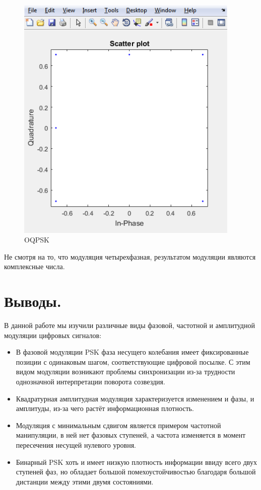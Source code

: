 \documentclass[a4paper,14pt]{extarticle}
\begin{document}
\begin{figure}[H]
\centering
\includegraphics[width=0.95\textwidth]{oqpsk}
\captionsetup{justification=centering,margin=1.0cm}
\caption{OQPSK}
\label{sig}
\end{figure}

Не смотря на то, что модуляция четырехфазная, результатом модуляции являются комплексные числа.

\vspace{8cm}

\section{Выводы.}

В данной работе мы изучили различные виды фазовой, частотной и амплитудной модуляции цифровых сигналов:
\begin{itemize}

\item В фазовой модуляции PSK фаза несущего колебания имеет фиксированные позиции с одинаковым шагом, соответствующие цифровой посылке. С этим видом модуляции возникают проблемы синхронизации из-за трудности однозначной интерпретации поворота созвездия.

\item Квадратурная амплитудная модуляция характеризуется изменением и фазы, и амплитуды, из-за чего растёт информационная плотность.

\item Модуляция с минимальным сдвигом является примером частотной манипуляции, в ней нет фазовых ступеней, а частота изменяется в момент пересечения несущей нулевого уровня.

\item Бинарный PSK хоть и имеет низкую плотность информации ввиду всего двух ступеней фаз, но обладает большой помехоустойчивостью благодаря большой дистанции между этими двумя состояниями.
\end{itemize}
\end{document}
